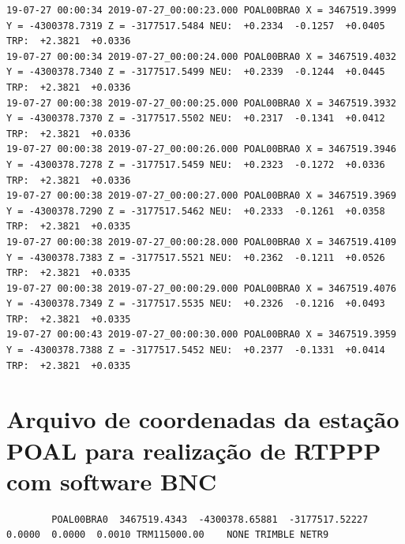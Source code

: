 \begin{lstlisting}
19-07-27 00:00:34 2019-07-27_00:00:23.000 POAL00BRA0 X = 3467519.3999 Y = -4300378.7319 Z = -3177517.5484 NEU:  +0.2334  -0.1257  +0.0405 TRP:  +2.3821  +0.0336
19-07-27 00:00:34 2019-07-27_00:00:24.000 POAL00BRA0 X = 3467519.4032 Y = -4300378.7340 Z = -3177517.5499 NEU:  +0.2339  -0.1244  +0.0445 TRP:  +2.3821  +0.0336
19-07-27 00:00:38 2019-07-27_00:00:25.000 POAL00BRA0 X = 3467519.3932 Y = -4300378.7370 Z = -3177517.5502 NEU:  +0.2317  -0.1341  +0.0412 TRP:  +2.3821  +0.0336
19-07-27 00:00:38 2019-07-27_00:00:26.000 POAL00BRA0 X = 3467519.3946 Y = -4300378.7278 Z = -3177517.5459 NEU:  +0.2323  -0.1272  +0.0336 TRP:  +2.3821  +0.0336
19-07-27 00:00:38 2019-07-27_00:00:27.000 POAL00BRA0 X = 3467519.3969 Y = -4300378.7290 Z = -3177517.5462 NEU:  +0.2333  -0.1261  +0.0358 TRP:  +2.3821  +0.0335
19-07-27 00:00:38 2019-07-27_00:00:28.000 POAL00BRA0 X = 3467519.4109 Y = -4300378.7383 Z = -3177517.5521 NEU:  +0.2362  -0.1211  +0.0526 TRP:  +2.3821  +0.0335
19-07-27 00:00:38 2019-07-27_00:00:29.000 POAL00BRA0 X = 3467519.4076 Y = -4300378.7349 Z = -3177517.5535 NEU:  +0.2326  -0.1216  +0.0493 TRP:  +2.3821  +0.0335
19-07-27 00:00:43 2019-07-27_00:00:30.000 POAL00BRA0 X = 3467519.3959 Y = -4300378.7388 Z = -3177517.5452 NEU:  +0.2377  -0.1331  +0.0414 TRP:  +2.3821  +0.0335
\end{lstlisting}
\section{Arquivo de coordenadas da estação POAL para realização de RTPPP com software BNC}
\begin{lstlisting}
        POAL00BRA0  3467519.4343  -4300378.65881  -3177517.52227  0.0000  0.0000  0.0010 TRM115000.00    NONE TRIMBLE NETR9
 \end{lstlisting}